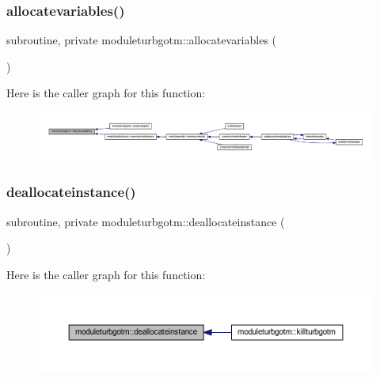 \subsubsection{\texorpdfstring{allocatevariables()}{allocatevariables()}}
{\footnotesize\ttfamily subroutine, private moduleturbgotm\+::allocatevariables (\begin{DoxyParamCaption}{ }\end{DoxyParamCaption})\hspace{0.3cm}{\ttfamily [private]}}

Here is the caller graph for this function\+:\nopagebreak
\begin{figure}[H]
\begin{center}
\leavevmode
\includegraphics[width=350pt]{namespacemoduleturbgotm_ad863a5918db79e19552388fff6750b22_icgraph}
\end{center}
\end{figure}
\mbox{\label{namespacemoduleturbgotm_ab38c9de41229ce2e4ae46d12471c0a00}} 
\subsubsection{\texorpdfstring{deallocateinstance()}{deallocateinstance()}}
{\footnotesize\ttfamily subroutine, private moduleturbgotm\+::deallocateinstance (\begin{DoxyParamCaption}{ }\end{DoxyParamCaption})\hspace{0.3cm}{\ttfamily [private]}}

Here is the caller graph for this function\+:\nopagebreak
\begin{figure}[H]
\begin{center}
\leavevmode
\includegraphics[width=350pt]{namespacemoduleturbgotm_ab38c9de41229ce2e4ae46d12471c0a00_icgraph}
\end{center}
\end{figure}
\mbox{\label{namespacemoduleturbgotm_a44eb11a0b54701f863dfae9be213de0e}} 
